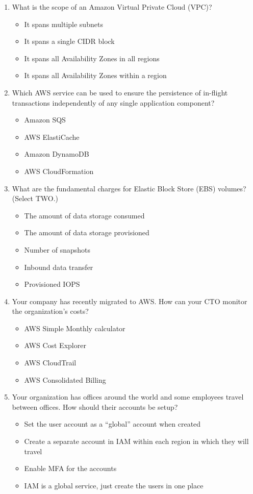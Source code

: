 \begin{enumerate}
	\item What is the scope of an Amazon Virtual Private Cloud (VPC)?
	\begin{itemize}
		\item It spans multiple subnets
		\item It spans a single CIDR block
		\item It spans all Availability Zones in all regions
		\item It spans all Availability Zones within a region
	\end{itemize}

	\item Which AWS service can be used to ensure the persistence of in-flight transactions independently of any single application component?
	\begin{itemize}
		\item Amazon SQS
		\item AWS ElastiCache
		\item Amazon DynamoDB
		\item AWS CloudFormation
	\end{itemize}

	\item What are the fundamental charges for Elastic Block Store (EBS) volumes? (Select TWO.)
	\begin{itemize}
		\item The amount of data storage consumed
		\item The amount of data storage provisioned
		\item Number of snapshots
		\item Inbound data transfer
		\item Provisioned IOPS
	\end{itemize}

	\item Your company has recently migrated to AWS. How can your CTO monitor the organization’s costs?
	\begin{itemize}
		\item AWS Simple Monthly calculator
		\item AWS Cost Explorer
		\item AWS CloudTrail
		\item AWS Consolidated Billing
	\end{itemize}

	\item Your organization has offices around the world and some employees travel between offices. How should their accounts be setup?
	\begin{itemize}
		\item Set the user account as a “global” account when created
		\item Create a separate account in IAM within each region in which they will travel
		\item Enable MFA for the accounts
		\item IAM is a global service, just create the users in one place
	\end{itemize}


\end{enumerate}

